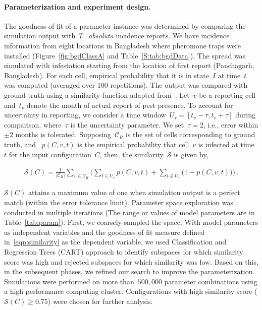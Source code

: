 \documentclass[11pt]{article}
\newcommand{\tuta}{\emph{T.~absoluta}}
\newcommand{\reportingCells}{\mathcal{C}_R}
\newcommand{\similarity}{\mathcal{S}}
\theoremstyle{definition}
\begin{document}
\paragraph{Parameterization and experiment design.}
The goodness of fit of a parameter instance was determined by comparing the
simulation output with \tuta{} incidence reports. We have incidence
information from eight locations in Bangladesh where pheromone traps were
installed (Figure~\ref{fig:bgdClassA} and Table~\ref{S:tab:bgdData}). The
spread was simulated with infestation starting from the location of first
report (Panchagarh, Bangladesh). For each cell, empirical probability that
it is in state~$I$ at time~$t$ was computed (averaged over 100
repetitions). The output was compared with ground truth using a similarity
function adapted from~\cite{carrasco2010unveiling}.  Let~$v$ be a reporting
cell and~$t_v$ denote the month of actual report of pest presence.  To
account for uncertainty in reporting, we consider a time
window~$U_\tau=[t_v-\tau,t_v+\tau]$ during comparison, where~$\tau$ is the
uncertainty parameter. We set~$\tau=2$, i.e., error within $\pm2$ months is
tolerated.  Supposing~$\reportingCells$ is the set of cells corresponding
to ground truth,  and ~$p(C,v,t)$ is the empirical probability that cell~$v$
is infected at time~$t$ for the input configuration~$C$, then, the similarity~$\similarity$ is
given by,
\begin{linenomath}
\begin{align}\label{eqn:similarity}
    \similarity(C)=\frac{1}{|\reportingCells|}\sum_{v\in\reportingCells} \Big(\sum_{t\in U_\tau}p(C,v,t)
    + \sum_{t\notin U_\tau}\big(1-p(C,v,t)\big) \Big)\,.
\end{align}
\end{linenomath}
$\similarity(C)$ attains a maximum value of one when simulation output is a
perfect match (within the error tolerance limit). Parameter space
exploration was conducted in multiple iterations (The range or values of
model parameters are in Table~\ref{tab:param}). First, we coarsely sampled
the space. With model parameters as independent variables and the goodness
of fit measure defined in~\eqref{eqn:similarity} as the dependent variable,
we used Classification and Regression Trees (CART) approach to identify
subspaces for which similarity score was high and rejected subspaces for
which similarity was low. Based on this, in the subsequent phases, we
refined our search to improve the parameterization. Simulations were
performed on more than~$500,000$ parameter combinations using a high
performance computing cluster. Configurations with high similarity score
($\similarity(C)\ge0.75$) were chosen for further analysis.
\end{document}
